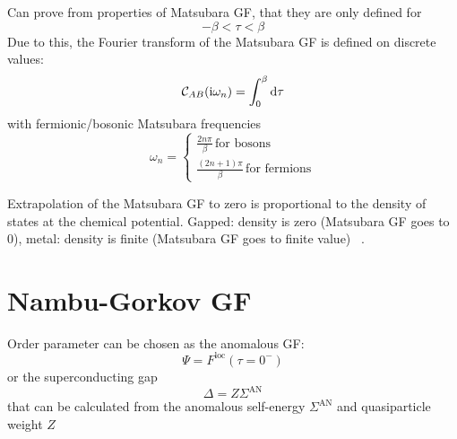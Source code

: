 Can prove from properties of Matsubara GF, that they are only defined for
\begin{equation}
    -\beta < \tau < \beta
\end{equation}
Due to this, the Fourier transform of the Matsubara GF is defined on discrete values:
\begin{equation}
    \mathcal{C}_{A B} (\iu \omega_n) = \int_{0}^{\beta} \odif{\tau}
\end{equation}
with fermionic/bosonic Matsubara frequencies
\begin{equation}
    \omega_n =
    \begin{cases}
        \frac{2n \pi}{\beta} \, \text{for bosons} \\
        \frac{(2n + 1)\pi}{\beta} \, \text{for fermions}
    \end{cases}
\end{equation}



Extrapolation of the Matsubara GF to zero is proportional to the density of states at the chemical potential.
Gapped: density is zero (Matsubara GF goes to 0), metal: density is finite (Matsubara GF goes to finite value) ~\cite[8.3.4]{Bruus_Flensberg_2004}.






\section{Nambu-Gorkov GF}


Order parameter can be chosen as the anomalous GF:
\begin{equation}
    \Psi = F^{\mathrm{loc}} (\tau = 0^-)
\end{equation}
or the superconducting gap
\begin{equation}
    \Delta = Z \Sigma^{\mathrm{AN}}
\end{equation}
that can be calculated from the anomalous self-energy \(\Sigma^{\mathrm{AN}}\) and quasiparticle weight \(Z\)


